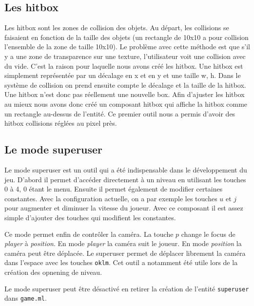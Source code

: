 \documentclass{article}
\begin{document}
\subsection{Les hitbox}
Les hitbox sont les zones de collision des objets. Au départ, les collisions se faisaient en fonction de 
la taille des objets (un rectangle de 10x10 a pour collision l'ensemble de la zone de taille 10x10). Le 
problème avec cette méthode est que s'il y a une zone de transparence sur une texture, l'utilisateur voit 
une collision avec du vide. C'est la raison pour laquelle nous avons créé les hitbox. Une hitbox est 
simplement représentée par un décalage en x et en y et une taille w, h. Dans le système de collision on 
prend ensuite compte le décalage et la taille de la hitbox. Une hitbox n'est donc pas réellement une 
nouvelle box. Afin d'ajuster les hitbox au mieux nous avons donc créé un composant hitbox qui affiche 
la hitbox comme un rectangle au-dessus de l'entité. Ce premier outil nous a permis d'avoir des hitbox 
collisions réglées au pixel près.

\subsection{Le mode superuser}
Le mode superuser est un outil qui a été indispensable dans le développement du jeu. D'abord il permet 
d'accéder directement à un niveau en utilisant les touches 0 à 4, 0 étant le menu. Ensuite il permet 
également de modifier certaines constantes. Avec la configuration actuelle, on a par exemple les 
touches $u$ et $j$ pour augmenter et diminuer la vitesse du joueur. Avec ce composant il est assez 
simple d'ajouter des touches qui modifient les constantes.

Ce mode permet enfin de contrôler la caméra. La touche $p$ change le focus de \textit{player} à 
\textit{position}. En mode \textit{player} la caméra suit le joueur. En mode \textit{position} 
la caméra peut être déplacée. Le superuser permet de déplacer librement la caméra dans l'espace
 avec les touches \verb|oklm|. Cet outil a notamment été utile lors de la création des opnening 
 de niveau.

Le mode superuser peut être désactivé en retirer la création de l'entité \verb|superuser| dans \verb|game.ml|.
\end{document}
